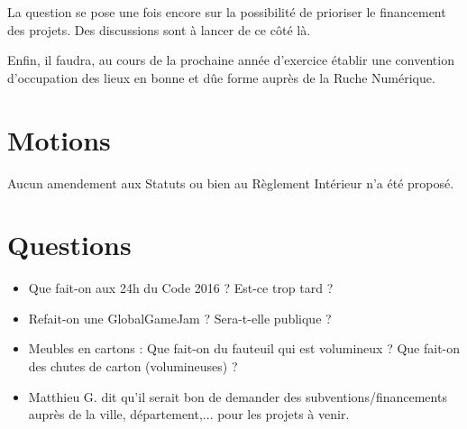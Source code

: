 \documentclass[11pt]{article}
\begin{document}
La question se pose une fois encore sur la possibilité de prioriser le financement des projets. Des discussions sont à
lancer de ce côté là.

Enfin, il faudra, au cours de la prochaine année d'exercice établir une convention d'occupation des lieux en bonne et dûe
forme auprès de la Ruche Numérique.

\section{Motions}

Aucun amendement aux Statuts ou bien au Règlement Intérieur n'a été proposé.

\section{Questions}

\begin{itemize}
	\item Que fait-on aux 24h du Code 2016 ? Est-ce trop tard ?
	\item Refait-on une GlobalGameJam ? Sera-t-elle publique ?
	\item Meubles en cartons : Que fait-on du fauteuil qui est volumineux ? Que fait-on des chutes de carton (volumineuses) ?
	\item Matthieu G. dit qu'il serait bon de demander des subventions/financements auprès de la ville, département,... pour les projets à venir.
\end{itemize}
\end{document}
